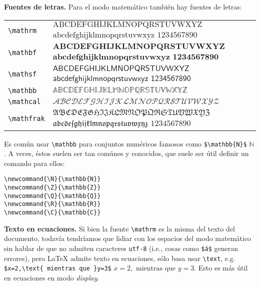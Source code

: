 \textbf{Fuentes de letras.} Para el modo matemático también hay fuentes de letras:
\begin{center}
	\begin{longtable}{lp{8cm}}
		\hline \hline
		\endhead
		\hline \hline
		\endfoot

		\lstinline|\mathrm|   & $\mathrm{ABCDEFGHIJKLMNOPQRSTUVWXYZ}$ $\mathrm{abcdefghijklmnopqrstuvwxyz}$ $\mathrm{1234567890}$ \\
		\lstinline|\mathbf|   & $\mathbf{ABCDEFGHIJKLMNOPQRSTUVWXYZ}$ $\mathbf{abcdefghijklmnopqrstuvwxyz}$ $\mathbf{1234567890}$ \\
		\lstinline|\mathsf|   & $\mathsf{ABCDEFGHIJKLMNOPQRSTUVWXYZ}$ $\mathsf{abcdefghijklmnopqrstuvwxyz}$ $\mathsf{1234567890}$ \\
		\lstinline|\mathbb|   & $\mathbb{ABCDEFGHIJKLMNOPQRSTUVWXYZ}$ \\
		\lstinline|\mathcal|  & $\mathcal{ABCDEFGHIJKLMNOPQRSTUVWXYZ}$ \\
		\lstinline|\mathfrak| & $\mathfrak{ABCDEFGHIJKLMNOPQRSTUVWXYZ}$ $\mathfrak{abcdefghijklmnopqrstuvwxyz}$ $\mathfrak{1234567890}$ \\
	\end{longtable}
\end{center}
Es común usar \lstinline|\mathbb| para conjuntos numéricos famosos como \lstinline|$\mathbb{N}$| $\mathbb{N}$. A veces, éstos suelen ser tan comúnes y conocidos, que suele ser útil definir un comando para ellos:
\begin{lstlisting}
\newcommand{\N}{\mathbb{N}}
\newcommand{\Z}{\mathbb{Z}}
\newcommand{\Q}{\mathbb{Q}}
\newcommand{\R}{\mathbb{R}}
\newcommand{\C}{\mathbb{C}}
\end{lstlisting}
\textbf{Texto en ecuaciones.} Si bien la fuente \lstinline|\mathrm| es la misma del texto del documento, todavía tendríamos que lidiar con los espacios del modo matemático sin hablar de que no admiten caracteres \texttt{utf-8} (i.e., cosas como \lstinline|$á$| generan errores), pero \LaTeX{} admite texto en ecuaciones, sólo basa usar \lstinline|\text|, e.g. \lstinline|$x=2,\text{ mientras que }y=3$| $x=2,\text{ mientras que }y=3$. Esto es más útil en ecuaciones en modo \textit{display}.


